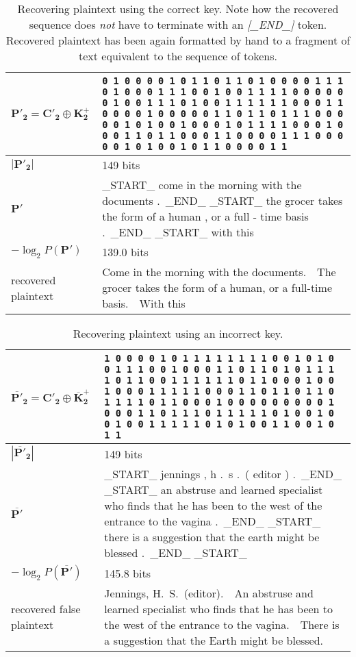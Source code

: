 \documentclass[draft]{IIBproject}
\DeclareRobustCommand{\ngram}[1]{\emph{[#1]}}
\begin{document}
\begin{table}[h]
	\centering
	\begin{tabular}{m{3cm} m{12cm}}
	\centering $\mathbf{P'_2} = \mathbf{C'_2} \oplus \mathbf{K^+_2}$ & \footnotesize \texttt{0 1 0 0 0 0 1 0 1 1 0 1 1 0 1 0 0 0 0 1 1 1 0 1 0 0 0 1 1 1 0 0 1 0 0 1 1 1 1 0 0 0 0 0 0 1 0 0 1 1 1 0 1 0 0 1 1 1 1 1 1 0 0 0 1 1 0 0 0 0 1 0 0 0 0 0 1 1 0 1 1 0 1 1 1 0 0 0 0 0 1 0 1 0 0 1 0 0 0 1 0 1 1 1 1 0 0 0 1 0 0 0 1 1 0 1 1 0 0 0 1 1 0 0 0 0 1 1 1 0 0 0 0 0 1 0 1 0 0 1 0 1 1 0 0 0 0 1 1} \\ \hline
	\centering $| \mathbf{P'_2} |$ & 149 bits \\ \hline
	\centering $\mathbf{P'}$ & \_START\_ come in the morning with the documents .\ \_END\_ \_START\_ the grocer takes the form of a human , or a full - time basis .\ \_END\_ \_START\_ with this \\ \hline
	\centering $-\log_2 P(\mathbf{P'})$ & 139.0 bits \\ \hline
	\centering recovered plaintext & Come in the morning with the documents.\ \ The grocer takes the form of a human, or a full-time basis.\ \ With this
	\end{tabular}
	\caption{\label{tab:results_correct_recovered_plaintext}Recovering plaintext using the correct key. Note how the recovered sequence does \emph{not} have to terminate with an \ngram{\_END\_} token. Recovered plaintext has been again formatted by hand to a fragment of text equivalent to the sequence of tokens.}
\end{table}

\begin{table}[h]
	\centering
	\begin{tabular}{m{3cm} m{12cm}}
	\centering $\mathbf{\overline{P'}_2} = \mathbf{C'_2} \oplus \mathbf{\overline K^+_2}$ & \footnotesize \texttt{1 0 0 0 0 1 0 1 1 1 1 1 1 1 1 0 0 1 0 1 0 0 1 1 1 0 0 1 0 0 0 1 1 0 1 1 0 1 0 1 1 1 1 0 1 1 0 0 1 1 1 1 1 1 0 1 1 0 0 0 1 0 0 1 0 0 0 1 1 1 1 1 0 0 0 1 1 0 1 1 0 1 1 0 1 1 1 1 0 1 1 0 0 0 1 0 0 0 0 0 0 0 0 0 1 0 0 0 1 1 0 1 1 1 0 1 1 1 1 1 0 1 0 0 1 0 0 1 0 0 1 1 1 1 1 0 1 0 1 0 0 1 1 0 0 1 0 1 1} \\ \hline
	\centering $| \mathbf{\overline{P'}_2} |$ & 149 bits \\ \hline
	\centering $\mathbf{\overline{P'}}$ & \_START\_ jennings , h .\ s .\ ( editor ) .\ \_END\_ \_START\_ an abstruse and learned specialist who finds that he has been to the west of the entrance to the vagina .\ \_END\_ \_START\_ there is a suggestion that the earth might be blessed .\ \_END\_ \_START\_ \\ \hline
	\centering $-\log_2 P(\mathbf{\overline{P'}})$ & 145.8 bits \\ \hline
	\centering recovered false plaintext & Jennings, H.\ S.\ (editor).\ \ An abstruse and learned specialist who finds that he has been to the west of the entrance to the vagina.\ \ There is a suggestion that the Earth might be blessed.
	\end{tabular}
	\caption{\label{tab:results_false_recovered_plaintext}Recovering plaintext using an incorrect key.}
\end{table}
\end{document}
